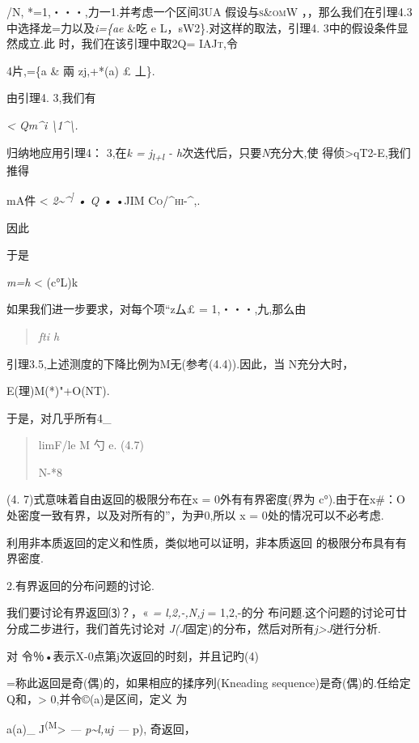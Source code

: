 \documentclass{article}
\begin{document}
/N, *=1,・・・,力一1.并考虑一个区间3UA 假设与\textsc{s\&omW}
，，那么我们在引理4.3中选择龙=力以及\emph{i=\{ae} \&吃 e
L，sW2\}.对这样的取法，引理4. 3中的假设条件显然成立.此
时，我们在该引理中取2Q= \textsc{IAJt,}令

4片,=\{a \& 兩 \textbar{}zj,+*(a) £ 丄\}.

由引理4. 3,我们有

\emph{\textless{} Qm\^{}i \textbackslash{}1\^{}\textbackslash{}.}

归纳地应用引理4： 3,在\emph{k = j\textsubscript{l+l} -
h}次迭代后，只要\emph{N}充分大,使
得\textbar{}侦\textgreater{}qT2-E,我们推得

mA件 \textless{} \emph{2\textasciitilde{}\^{}\textsuperscript{{]}} • Q
•} \textsc{•JIM Co\textbar{}/\^{}\textbar{}hi-\^{},.}

因此

于是

\emph{m=h} \textless{} (c°\textbar{}L\textbar{})k

如果我们进一步要求，对每个项``z厶£ = 1,・・・,九,那么由

\begin{quote}
\emph{fti h}
\end{quote}

引理3.5,上述测度的下降比例为M无(参考(4.4)).因此，当 N充分大时，

E(理)M(*)"+O(NT).

于是，对几乎所有4\_

\begin{quote}
\textbar{}\textbar{} limF/le M 勺 e. (4.7)

N-*8
\end{quote}

(4. 7)式意味着自由返回的极限分布在x = 0外有有界密度(界为
c°).由于在x\#：O处密度一致有界，以及对所有的''，为尹0,所以 x =
0处的情况可以不必考虑.

利用非本质返回的定义和性质，类似地可以证明，非本质返回
的极限分布具有有界密度.

2.有界返回的分布问题的讨论.

我们要讨论有界返回⑶？，« \emph{= l,2,-,N,j} = 1,2,-的分
布问题.这个问题的讨论可廿分成二步进行，我们首先讨论对
\emph{J(J}固定)的分布，然后对所有\emph{j\textgreater{}J}迸行分析.

对 令％•表示X-0点第j次返回的时刻，并且记旳(4)

=称此返回是奇(偶)的，如果相应的揉序列(Kneading
sequence)是奇(偶)的.任给定Q和，\textgreater{} 0,并令©(a)是区间，定义 为

a(a)\_ J\textsuperscript{(M}\textgreater{} \emph{---
p\textasciitilde{}l,uj ---} p), 奇返回，
\end{document}
